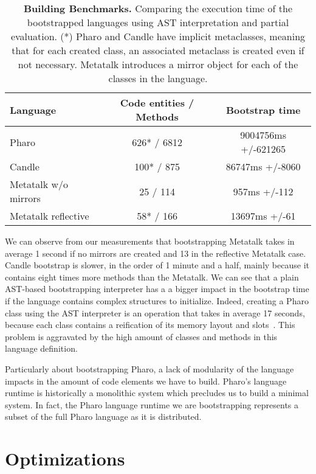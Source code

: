  \begin{table}[ht]
 \small
 	\centering
 	\begin{tabular}{|l|c|c|}
			\hline
			\textbf{Language}
			& \xspace\textbf{Code entities / Methods}\xspace
			& \xspace\textbf{Bootstrap time}\\
		\hline
		Pharo & 626* / 6812 & 9004756ms +/-621265 \\\hline
		Candle & 100* / 875 & 86747ms +/-8060 \\\hline
		Metatalk w/o mirrors & 25 / 114 & 957ms +/-112 \\\hline
		Metatalk reflective & 58* / 166 & 13697ms +/-61 \\\hline
 	\end{tabular}
		\vspace*{0.2cm}
 	\caption{\small\textbf{Building Benchmarks.} Comparing the execution time of the bootstrapped languages using AST interpretation and partial evaluation. (*) Pharo and Candle have implicit metaclasses, meaning that for each created class, an associated metaclass is created even if not necessary. Metatalk introduces a mirror object for each of the classes in the language.\label{tb:measurements}}
 \end{table}

We can observe from our measurements that bootstrapping Metatalk takes in average 1 second if no mirrors are created and 13 in the reflective Metatalk case. Candle bootstrap is slower, in the order of 1 minute and a half, mainly because it contains eight times more methods than the Metatalk. We can see that a plain AST-based bootstrapping interpreter has a a bigger impact in the bootstrap time if the language contains complex structures to initialize.  Indeed, creating a Pharo class using the AST interpreter is an operation that takes in average 17 seconds, because each class contains a reification of its memory layout and slots~\cite{Verw11a}. This problem is aggravated by the high amount of classes and methods in this language definition.

Particularly about bootstrapping Pharo, a lack of modularity of the language impacts in the amount of code elements we have to build. Pharo's language runtime is historically a monolithic system which precludes us to build a minimal system. In fact, the Pharo language runtime we are bootstrapping represents a subset of the full Pharo language as it is distributed.

\section{Optimizations}\label{sec:optimisations}

